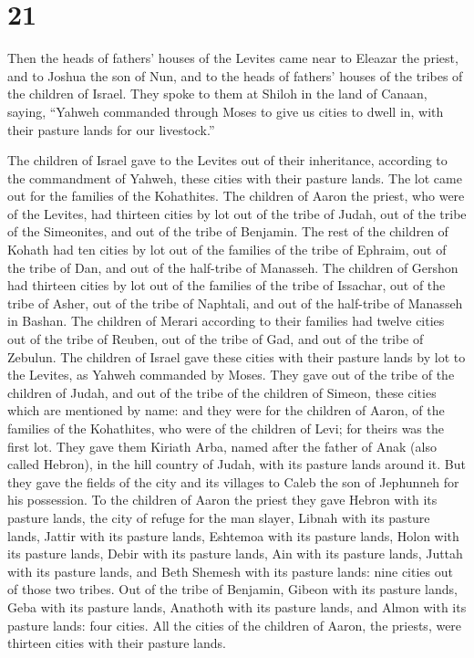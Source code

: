 \hypertarget{section-20}{%
\section{21}\label{section-20}}

 Then the heads of fathers' houses of the Levites came near
to Eleazar the priest, and to Joshua the son of Nun, and to the heads of
fathers' houses of the tribes of the children of Israel. 
They spoke to them at Shiloh in the land of Canaan, saying, ``Yahweh
commanded through Moses to give us cities to dwell in, with their
pasture lands for our livestock.''

 The children of Israel gave to the Levites out of their
inheritance, according to the commandment of Yahweh, these cities with
their pasture lands.  The lot came out for the families of
the Kohathites. The children of Aaron the priest, who were of the
Levites, had thirteen cities by lot out of the tribe of Judah, out of
the tribe of the Simeonites, and out of the tribe of Benjamin.
 The rest of the children of Kohath had ten cities by lot
out of the families of the tribe of Ephraim, out of the tribe of Dan,
and out of the half-tribe of Manasseh.  The children of
Gershon had thirteen cities by lot out of the families of the tribe of
Issachar, out of the tribe of Asher, out of the tribe of Naphtali, and
out of the half-tribe of Manasseh in Bashan.  The children
of Merari according to their families had twelve cities out of the tribe
of Reuben, out of the tribe of Gad, and out of the tribe of Zebulun.
 The children of Israel gave these cities with their pasture
lands by lot to the Levites, as Yahweh commanded by Moses. 
They gave out of the tribe of the children of Judah, and out of the
tribe of the children of Simeon, these cities which are mentioned by
name:  and they were for the children of Aaron, of the
families of the Kohathites, who were of the children of Levi; for theirs
was the first lot.  They gave them Kiriath Arba, named
after the father of Anak (also called Hebron), in the hill country of
Judah, with its pasture lands around it.  But they gave the
fields of the city and its villages to Caleb the son of Jephunneh for
his possession.  To the children of Aaron the priest they
gave Hebron with its pasture lands, the city of refuge for the man
slayer, Libnah with its pasture lands,  Jattir with its
pasture lands, Eshtemoa with its pasture lands,  Holon with
its pasture lands, Debir with its pasture lands,  Ain with
its pasture lands, Juttah with its pasture lands, and Beth Shemesh with
its pasture lands: nine cities out of those two tribes. 
Out of the tribe of Benjamin, Gibeon with its pasture lands, Geba with
its pasture lands,  Anathoth with its pasture lands, and
Almon with its pasture lands: four cities.  All the cities
of the children of Aaron, the priests, were thirteen cities with their
pasture lands.

